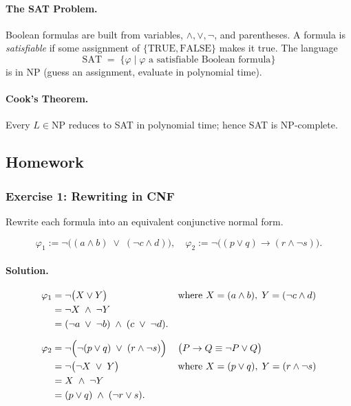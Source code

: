 \documentclass{article}
\theoremstyle{theorem}
\theoremstyle{definition}
\theoremstyle{remark}
\begin{document}
\paragraph{The SAT Problem.}  Boolean formulas are built from variables,
\(\land,\lor,\lnot\), and parentheses.  A formula is \emph{satisfiable} if
some assignment of \(\{\mathrm{TRUE},\mathrm{FALSE}\}\) makes it true.
The language
\[
  \mathrm{SAT}
  \;=\;
  \bigl\{\varphi\mid \varphi\text{ a satisfiable Boolean formula}\bigr\}
\]
is in \(\mathrm{NP}\) (guess an assignment, evaluate in polynomial time).
\paragraph{Cook’s Theorem.}  Every \(L\in\mathrm{NP}\) reduces to SAT in
polynomial time; hence SAT is NP‐complete.

\subsection{Homework}\label{sec:week8-9-exercises}

\subsubsection*{Exercise 1: Rewriting in CNF}  
Rewrite each formula into an equivalent conjunctive normal form.

\[
\varphi_1 := \neg\bigl((a\land b)\;\lor\;(\neg c\land d)\bigr),
\quad
\varphi_2 := \neg\bigl((p\lor q)\to(r\land\neg s)\bigr).
\]

\paragraph{Solution.}
\[
\begin{aligned}
\varphi_1 
&= \neg\bigl(X\lor Y\bigr)
  &&\text{where }X=(a\land b),\;Y=(\neg c\land d)\\
&= \neg X\;\land\;\neg Y\\
&= (\neg a\;\lor\;\neg b)\;\land\;(c\;\lor\;\neg d).
\\[6pt]
\varphi_2 
&= \neg\Bigl(\neg(p\lor q)\;\lor\;(r\land\neg s)\Bigr)
  &&\bigl(P\to Q\equiv\neg P\lor Q\bigr)\\
&= \neg\bigl(\neg X\;\lor\;Y\bigr)
  &&\text{where }X=(p\lor q),\;Y=(r\land\neg s)\\
&= X\;\land\;\neg Y\\
&= (p\lor q)\;\land\;(\neg r\lor s).
\end{aligned}
\]
\end{document}
